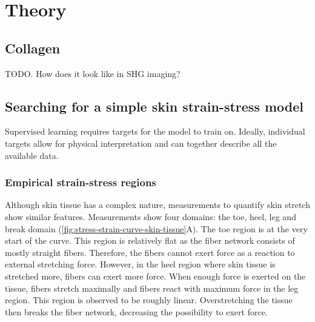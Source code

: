 \section{Theory}

\subsection{Collagen}
TODO. How does it look like in SHG imaging?


\subsection{Searching for a simple skin strain-stress model}

Supervised learning requires targets for the model to train on.
Ideally, individual targets allow for physical interpretation and can together describe all the available data.

\subsubsection{Empirical strain-stress regions}
Although skin tissue has a complex nature, measurements to quantify skin stretch show similar features.
Measurements show four domains: the toe, heel, leg and break domain (\cref{fig:stress-strain-curve-skin-tissue}A).
The toe region is at the very start of the curve.
This region is relatively flat as the fiber network consists of mostly straight fibers.
Therefore, the fibers cannot exert force as a reaction to external stretching force.
However, in the heel region where skin tissue is stretched more, fibers can exert more force.
When enough force is exerted on the tissue, fibers stretch maximally and fibers react with maximum force in the leg region.
This region is observed to be roughly linear.
Overstretching the tissue then breaks the fiber network, decreasing the possibility to exert force.

